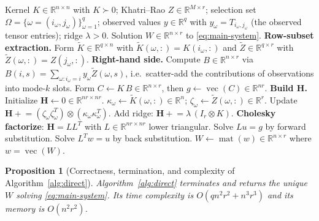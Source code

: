 \documentclass[12pt]{article}
\newtheorem{proposition}[theorem]{Proposition}
\theoremstyle{definition}
\newcommand{\vecop}{\operatorname{vec}}
\newcommand{\matop}{\operatorname{mat}}
\newcommand{\R}{\mathbb{R}}
\newcommand{\Kt}{\widetilde{K}}
\newcommand{\Zt}{\widetilde{Z}}
\begin{document}
\begin{algorithm}[ht]
\caption{Direct symmetric solver for $\mathbf{H}\,\vecop(W)=(I_r\otimes K)\vecop(B)$}\label{alg:direct}
\begin{algorithmic}[1]
\Require Kernel $K\in\R^{n\times n}$ with $K\succ 0$; Khatri--Rao $Z\in\R^{M\times r}$;
selection set $\Omega=\{\omega=(i_\omega,j_\omega)\}_{\omega=1}^q$; observed values
$y\in\R^q$ with $y_\omega=T_{i_\omega,j_\omega}$ (the observed tensor entries);
ridge $\lambda>0$.
\Ensure Solution $W\in\R^{n\times r}$ to \eqref{eq:main-system}.
\State \textbf{Row-subset extraction.}\;
       Form $\Kt\in\R^{q\times n}$ with $\Kt(\omega,:)=K(i_\omega,:)$ and
       $\Zt\in\R^{q\times r}$ with $\Zt(\omega,:)=Z(j_\omega,:)$.
\State \textbf{Right-hand side.}\;
       Compute $B\in\R^{n\times r}$ via $B(i,s)=\sum_{\omega:i_\omega=i} y_\omega \Zt(\omega,s)$,
       i.e.\ scatter-add the contributions of observations into mode-$k$ slots.
\State Form $C\leftarrow K\,B \in\R^{n\times r}$, then $g \leftarrow \vecop(C)\in\R^{nr}$.
       \Comment{$g=(I_r\otimes K)\vecop(B)$; cost $O(n^2 r)$}
\State \textbf{Build $\mathbf{H}$.}\;
       Initialize $\mathbf{H}\leftarrow 0\in\R^{nr\times nr}$.
   \State $\kappa_\omega \leftarrow \Kt(\omega,:)\in\R^{n}$;\quad
          $\zeta_\omega \leftarrow \Zt(\omega,:)\in\R^{r}$.
   \State Update $\mathbf{H}\mathrel{+}= (\zeta_\omega\zeta_\omega^T)\otimes(\kappa_\omega\kappa_\omega^T)$.
\EndFor
\State Add ridge: $\mathbf{H}\mathrel{+}=\lambda\,(I_r\otimes K)$.\quad
\State \textbf{Cholesky factorize}: $\mathbf{H} = L L^T$ with $L\in\R^{nr\times nr}$ lower
       triangular.\quad {}
\State Solve $L u = g$ by forward substitution.\quad {}
\State Solve $L^T w = u$ by back substitution.\quad {}
\State \Return $W \leftarrow \matop(w)\in\R^{n\times r}$ where $w=\vecop(W)$.
\end{algorithmic}
\end{algorithm}

\begin{proposition}[Correctness, termination, and complexity of Algorithm~\ref{alg:direct}]
\label{prop:direct-cost}
Algorithm~\ref{alg:direct} terminates and returns the unique $W$ solving \eqref{eq:main-system}.
Its time complexity is $O(qn^2r^2+n^3r^3)$ and its memory is $O(n^2r^2)$.
\end{proposition}
\end{document}
